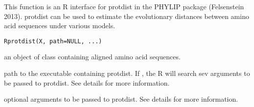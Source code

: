 \documentclass[a4paper]{book}
\begin{document}
%
\begin{Description}\relax
This function is an R interface for protdist in the PHYLIP package (Felsenstein 2013). protdist can be used to estimate the evolutionary distances between amino acid sequences under various models.
\end{Description}
%
\begin{Usage}
\begin{verbatim}
Rprotdist(X, path=NULL, ...)
\end{verbatim}
\end{Usage}
%
\begin{Arguments}
\begin{ldescription}
\item[\code{X}] an object of class  containing aligned amino acid sequences.
\item[\code{path}] path to the executable containing protdist. If , the R will search sev arguments to be passed to protdist. See details for more information.
\item[\code{...}] optional arguments to be passed to protdist. See details for more information.
\end{ldescription}
\end{Arguments}
%
\end{document}
